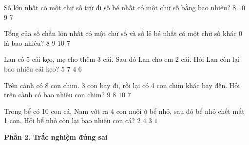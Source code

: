\begin{ex} %
Số lớn nhất có một chữ số trừ đi số bé nhất có một chữ số bằng bao nhiêu?
\choice
{$8$}
{$10$}
{\True $9$}
{$7$}
\end{ex}

\begin{ex} %
Tổng của số chẵn lớn nhất có một chữ số và số lẻ bé nhất có một chữ số khác 0 là bao nhiêu?
\choice
{$8$}
{\True $9$}
{$10$}
{$7$}
\end{ex}

\begin{ex} %
Lan có 5 cái kẹo, mẹ cho thêm 3 cái. Sau đó Lan cho em 2 cái. Hỏi Lan còn lại bao nhiêu cái kẹo?
\choice
{$5$}
{$7$}
{$4$}
{\True $6$}
\end{ex}

\begin{ex} %
Trên cành có 8 con chim. 3 con bay đi, rồi lại có 4 con chim khác bay đến. Hỏi trên cành có bao nhiêu con chim?
\choice
{\True $9$}
{$8$}
{$10$}
{$7$}
\end{ex}

\begin{ex} %
Trong bể có 10 con cá. Nam vớt ra 4 con nuôi ở bể nhỏ, sau đó bể nhỏ chết mất 1 con. Hỏi bể nhỏ còn lại bao nhiêu con cá?
\choice
{$2$}
{$4$}
{\True $3$}
{$1$}
\end{ex}

\textbf{Phần 2. Trắc nghiệm đúng sai}

